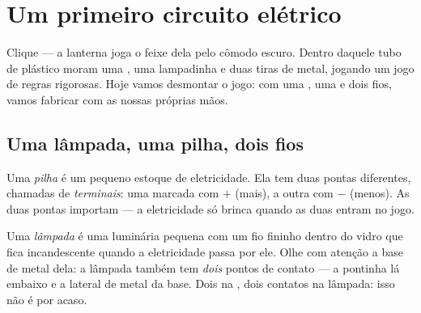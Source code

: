 \chapter{Um primeiro circuito elétrico}\label{ch:g3:first-electric-circuit}

Clique --- a lanterna joga o feixe dela pelo cômodo escuro. Dentro
daquele tubo de plástico moram uma , uma lampadinha e duas tiras
de metal, jogando um jogo de regras rigorosas. Hoje vamos desmontar o
jogo: com uma , uma  e dois fios, vamos fabricar  com
as nossas próprias mãos.

\section{Uma lâmpada, uma pilha, dois fios}

\begin{definition}[A pilha]\label{def:g3:first-electric-circuit:battery}
Uma \emph{pilha} é um pequeno estoque de eletricidade.
Ela tem duas pontas diferentes, chamadas de
\emph{terminais}: uma marcada com $+$ (mais), a outra
com $-$ (menos). As duas pontas importam --- a eletricidade só brinca
quando as duas entram no jogo.
\end{definition}

\begin{definition}[A lâmpada]\label{def:g3:first-electric-circuit:bulb}
Uma \emph{lâmpada} é uma luminária pequena com um fio
fininho dentro do vidro que fica incandescente quando a eletricidade
passa por ele. Olhe com atenção a base de metal dela: a lâmpada
também tem \emph{dois} pontos de contato --- a pontinha lá embaixo e
a lateral de metal da base. Dois  na , dois contatos na
lâmpada: isso não é por acaso.
\end{definition}

